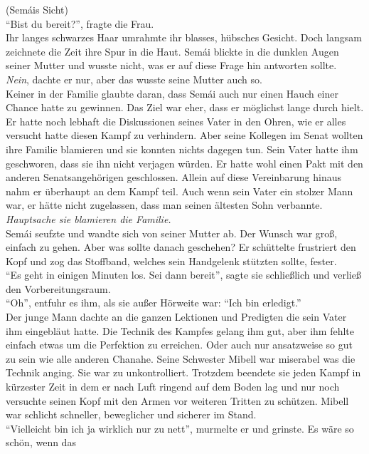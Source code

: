 (Semáis Sicht)\\
``Bist du bereit?'', fragte die Frau. \\
Ihr langes schwarzes Haar umrahmte ihr blasses, hübsches Gesicht. Doch langsam zeichnete die Zeit 
ihre Spur in die Haut. Semái blickte in die dunklen Augen seiner Mutter und wusste nicht, was er 
auf diese Frage hin antworten sollte. \\
\textit{Nein}, dachte er nur, aber das wusste seine Mutter auch so.\\
Keiner in der Familie glaubte daran, dass Semái auch nur einen Hauch einer Chance hatte zu 
gewinnen. Das Ziel war eher, dass er möglichst lange durch hielt. Er hatte noch lebhaft die 
Diskussionen seines Vater in den Ohren, wie er alles versucht hatte diesen Kampf zu verhindern. Aber 
seine Kollegen im Senat wollten ihre Familie blamieren und sie konnten nichts dagegen tun. Sein 
Vater hatte ihm geschworen, dass sie ihn nicht verjagen würden. Er hatte wohl einen Pakt mit den 
anderen Senatsangehörigen geschlossen. Allein auf diese Vereinbarung hinaus nahm er überhaupt an dem 
Kampf teil. Auch wenn sein Vater ein stolzer Mann war, er hätte nicht zugelassen, dass man seinen 
ältesten Sohn verbannte. \\
\textit{Hauptsache sie blamieren die Familie.}\\
Semái seufzte und wandte sich von seiner Mutter ab. Der Wunsch war groß, einfach zu gehen. Aber was 
sollte danach geschehen? Er schüttelte frustriert den Kopf und zog das Stoffband, welches sein 
Handgelenk stützten sollte, fester. \\
``Es geht in einigen Minuten los. Sei dann bereit'', sagte sie schließlich und verließ den 
Vorbereitungsraum. \\
``Oh'', entfuhr es ihm, als sie außer Hörweite war: ``Ich bin erledigt.'' \\
Der junge Mann dachte an die ganzen Lektionen und Predigten die sein Vater ihm eingebläut hatte. 
Die Technik des Kampfes gelang ihm gut, aber ihm fehlte einfach etwas um die Perfektion zu 
erreichen. Oder auch nur ansatzweise so gut zu sein wie alle anderen Chanahe. Seine Schwester Mibell 
war miserabel was die Technik anging. Sie war zu unkontrolliert. Trotzdem beendete sie jeden Kampf 
in kürzester Zeit in dem er nach Luft ringend auf dem Boden lag und nur noch versuchte seinen Kopf 
mit den Armen vor weiteren Tritten zu schützen. Mibell war schlicht schneller, beweglicher und 
sicherer im Stand. \\
``Vielleicht bin ich ja wirklich nur zu nett'', murmelte er und grinste. Es wäre so schön, wenn das 
